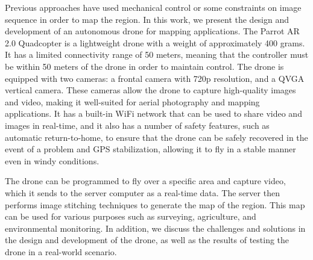 \documentclass[
  journal=largetwo,
  manuscript=article-type,
  year=2023,
  volume=1,
]{iitp-journal}
\begin{document}
Previous approaches have used mechanical control or some constraints on image sequence in order to map the region. In this work, we present the design and development of an autonomous drone for mapping applications. The Parrot AR 2.0 Quadcopter is a lightweight drone with a weight of approximately 400 grams. It has a limited connectivity range of 50 meters, meaning that the controller must be within 50 meters of the drone in order to maintain control. The drone is equipped with two cameras: a frontal camera with 720p resolution, and a QVGA vertical camera. These cameras allow the drone to capture high-quality images and video, making it well-suited for aerial photography and mapping applications. It has a built-in WiFi network that can be used to share video and images in real-time, and it also has a number of safety features, such as automatic return-to-home, to ensure that the drone can be safely recovered in the event of a problem and GPS stabilization, allowing it to fly in a stable manner even in windy conditions.

The drone can be programmed to fly over a specific area and capture video, which it sends to the server computer as a real-time data. The server then performs image stitching techniques to generate the map of the region. This map can be used for various purposes such as surveying, agriculture, and environmental monitoring. In addition, we discuss the challenges and solutions in the design and development of the drone, as well as the results of testing the drone in a real-world scenario.

\end{document}
